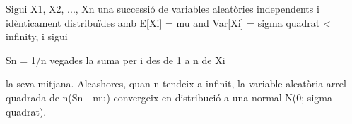 \documentclass{article}
\begin{document}

Sigui X1, X2, ..., Xn una successió de variables aleatòries 
independents i idènticament distribuïdes amb
E[Xi] = mu and Var[Xi] = sigma quadrat < infinity, 
i sigui

Sn = 1/n vegades la suma per i des de 1 a n de Xi

la seva mitjana. Aleashores, quan  n tendeix a infinit, la 
variable aleatòria arrel quadrada de n(Sn - mu) convergeix en
distribució a una normal N(0; sigma quadrat).
\end{document}
